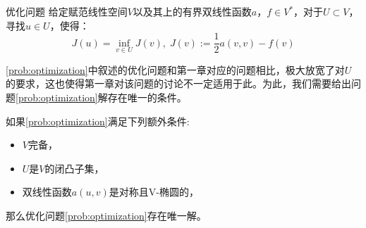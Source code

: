 \documentclass[lang=cn,10pt,newtx]{elegantbook}
\begin{document}
\begin{definition}{优化问题}
  \label{prob:optimization}
  给定赋范线性空间$V$以及其上的有界双线性函数$a$，$f\in V^{*}$，对于$U\subset V$，寻找$u\in U$，使得：
  \begin{equation}
    \label{eq:optimization}
    J(u)=\inf_{v\in U}J(v),\; J(v):=\frac{1}{2}a(v,v)-f(v)
  \end{equation}
\end{definition}
\ref{prob:optimization}中叙述的优化问题和第一章对应的问题相比，极大放宽了对$U$的要求，这也使得第一章对该问题的讨论不一定适用于此。为此，我们需要给出问题\ref{prob:optimization}解存在唯一的条件。
\begin{theorem}
  如果\ref{prob:optimization}满足下列额外条件:
  \begin{itemize}
    \item $V$完备，
    \item $U$是$V$的闭凸子集，
    \item 双线性函数$a(u,v)$是对称且V-椭圆的，
  \end{itemize}
  那么优化问题\ref{prob:optimization}存在唯一解。
\end{theorem}
\end{document}
